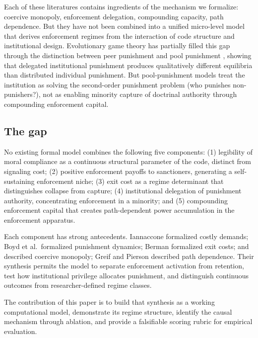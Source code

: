 \documentclass[12pt]{article}
\begin{document}
Each of these literatures contains ingredients of the mechanism we formalize: coercive monopoly, enforcement delegation, compounding capacity, path dependence. But they have not been combined into a unified micro-level model that derives enforcement regimes from the interaction of code structure and institutional design. Evolutionary game theory has partially filled this gap through the distinction between peer punishment and pool punishment \citep{hilbe2014,sigmund2010}, showing that delegated institutional punishment produces qualitatively different equilibria than distributed individual punishment. But pool-punishment models treat the institution as solving the second-order punishment problem (who punishes non-punishers?), not as enabling minority capture of doctrinal authority through compounding enforcement capital.

\subsection{The gap}

No existing formal model combines the following five components: (1) legibility of moral compliance as a continuous structural parameter of the code, distinct from signaling cost; (2) positive enforcement payoffs to sanctioners, generating a self-sustaining enforcement niche; (3) exit cost as a regime determinant that distinguishes collapse from capture; (4) institutional delegation of punishment authority, concentrating enforcement in a minority; and (5) compounding enforcement capital that creates path-dependent power accumulation in the enforcement apparatus.

Each component has strong antecedents. Iannaccone formalized costly demands; Boyd et al.\ formalized punishment dynamics; Berman formalized exit costs; \citet{weber1946} and \citet{tilly1985} described coercive monopoly; Greif and Pierson described path dependence. Their synthesis permits the model to separate enforcement activation from retention, test how institutional privilege allocates punishment, and distinguish continuous outcomes from researcher-defined regime classes.

The contribution of this paper is to build that synthesis as a working computational model, demonstrate its regime structure, identify the causal mechanism through ablation, and provide a falsifiable scoring rubric for empirical evaluation.


\end{document}
